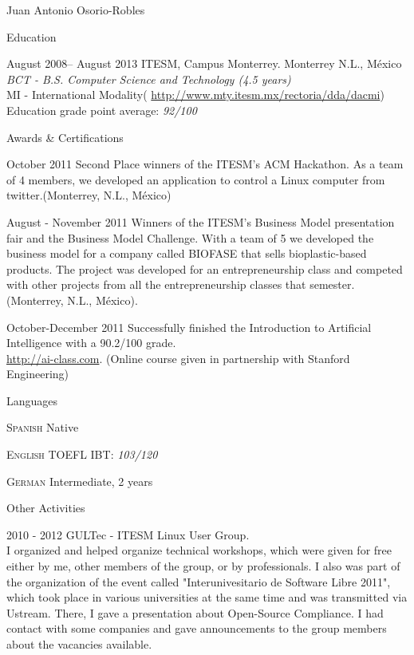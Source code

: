 \documentclass[english,11pt,letterpaper]{article}
\begin{document}
\begin{cv}{Juan Antonio Osorio-Robles}
\begin{cvlist}{Education}
		\item	[August 2008-- August 2013]
			ITESM, Campus Monterrey. Monterrey N.L., M\'{e}xico\\
			\emph{BCT - B.S. Computer Science and Technology (4.5 years)}\\
			MI - International Modality(
            \href{http://www.mty.itesm.mx/rectoria/dda/dacmi}
            {http://www.mty.itesm.mx/rectoria/dda/dacmi})\\
			Education grade point average: \emph{92/100}
	\end{cvlist}

	\begin{cvlist}{Awards \& Certifications}
		\item [October 2011] Second Place winners of the ITESM's ACM Hackathon.
            As a team of 4 members, we developed an application to control a
            Linux computer from twitter.(Monterrey, N.L., M\'{e}xico)
		\item [August - November 2011] Winners of the ITESM's Business Model
            presentation fair and the Business Model Challenge. With a team of
            5 we developed the business model for a company called BIOFASE that
            sells bioplastic-based products. The project was developed for an
            entrepreneurship class and competed with other projects from all
            the entrepreneurship classes that semester.
            (Monterrey, N.L., M\'{e}xico).
		\item [October-December 2011] Successfully finished the Introduction to
            Artificial Intelligence with a 90.2/100 grade. \\
		    \href{http://ai-class.com}{http://ai-class.com}. (Online course
            given in partnership with Stanford Engineering)
	\end{cvlist}


	\begin{cvlist}{Languages}
		\item [\textsc {Spanish}]
				Native
		\item [\textsc {English}]
				TOEFL IBT: \emph{103/120}
		\item [\textsc {German}]
				Intermediate, 2 years
		\end{cvlist}

	\begin{cvlist}{Other Activities}
		\item [2010 - 2012] GULTec - ITESM Linux User Group.\\
			I organized and helped organize technical workshops, which were
            given for free either by me, other members of the group, or by
            professionals. I also was part of the organization of the event
            called "Interunivesitario de Software Libre 2011", which took place
            in various universities at the same time and was transmitted via
            Ustream. There, I gave a presentation about Open-Source Compliance.
            I had contact with some companies and gave announcements to the
            group members about the vacancies available.
	\end{cvlist}


\end{cv}
\end{document}
